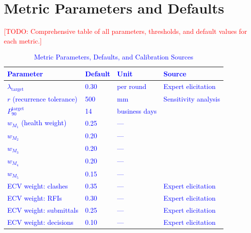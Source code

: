 \documentclass[conference]{IEEEtran}
\newcommand{\todo}[1]{\textcolor{red}{[TODO: #1]}}
\newcommand{\placeholder}[1]{\textcolor{blue}{#1}}
\begin{document}
\section{Metric Parameters and Defaults}
\placeholder{
\todo{Comprehensive table of all parameters, thresholds, and default values for each metric.}

\begin{table}[htbp]
    \centering
    \caption{Metric Parameters, Defaults, and Calibration Sources}
    \label{tab:params}
    \begin{tabular}{llll}
        \toprule
        Parameter & Default & Unit & Source \\
        \midrule
        $\lambda_{\text{target}}$ & 0.30 & per round & Expert elicitation \\
        $r$ (recurrence tolerance) & 500 & mm & Sensitivity analysis \\
        $P_{90}^{\text{target}}$ & 14 & business days & \cite{navigant2013} \\
        $w_{M_1}$ (health weight) & 0.25 & --- & \cite{cii2005} \\
        $w_{M_2}$ & 0.20 & --- & \cite{cii2005} \\
        $w_{M_3}$ & 0.20 & --- & \cite{cii2005} \\
        $w_{M_4}$ & 0.20 & --- & \cite{cii2005} \\
        $w_{M_5}$ & 0.15 & --- & \cite{cii2005} \\
        ECV weight: clashes & 0.35 & --- & Expert elicitation \\
        ECV weight: RFIs & 0.30 & --- & Expert elicitation \\
        ECV weight: submittals & 0.25 & --- & Expert elicitation \\
        ECV weight: decisions & 0.10 & --- & Expert elicitation \\
        \bottomrule
    \end{tabular}
\end{table}
}



\end{document}

